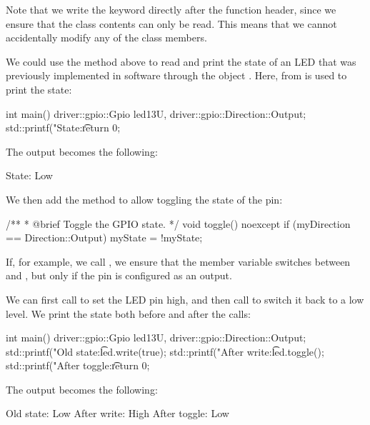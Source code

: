 \noindent Note that we write the keyword  directly after the function header, since we
ensure that the class contents can only be read. This means that we cannot accidentally modify any
of the class members.

We could use the method above to read and print the state of an LED that was previously implemented
in software through the object . Here,  from  is used
to print the state:

\begin{cppcode}
int main()
{
    driver::gpio::Gpio led{13U, driver::gpio::Direction::Output};
    std::printf("State:\t%
    return 0;
}
\end{cppcode}

\noindent The output becomes the following:

\begin{console}
State:  Low
\end{console}

\noindent We then add the method  to allow toggling the state of the pin:

\begin{cppcode}
/**
 * @brief Toggle the GPIO state.
 */
void toggle() noexcept
{
    if (myDirection == Direction::Output)
    {
        myState = !myState;
    }
}
\end{cppcode}

\noindent If, for example, we call , we ensure that the member variable
 switches between  and , but only if the pin is configured as
an output.

We can first call  to set the LED pin high, and then call  to
switch it back to a low level. We print the state both before and after the calls:

\begin{cppcode}
int main()
{
    driver::gpio::Gpio led{13U, driver::gpio::Direction::Output};
    std::printf("Old state:\t%
    led.write(true);
    std::printf("After write:\t%
    led.toggle();
    std::printf("After toggle:\t%
    return 0;
}
\end{cppcode}

\noindent The output becomes the following:

\begin{console}
Old state:      Low
After write:    High
After toggle:   Low
\end{console}

